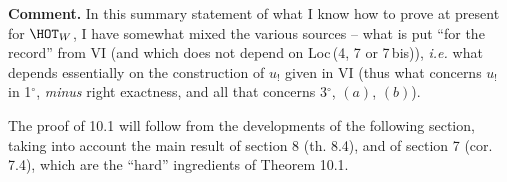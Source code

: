 
\textbf{Comment.} In this summary statement of what I know how to prove at present for $\HOT_W$, I have somewhat mixed the various sources – what is put ``for the record'' from VI (and which does not depend on Loc\,(4, 7 or 7\,bis)), \textit{i.e.} what depends essentially on the construction of $u_!$ given in VI (thus what concerns $u_!$ in 1$^{\circ}$, \textit{minus} right exactness, and all that concerns 3$^{\circ}$, $(a)$, $(b)$).

The proof of 10.1 will follow from the developments of the following section, taking into account the main result of section 8 (th. 8.4), and of section 7 (cor. 7.4), which are the ``hard'' ingredients of Theorem 10.1.